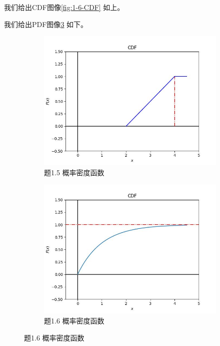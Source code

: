 \documentclass{article}
\begin{document}
	我们给出CDF图像\ref{fig:1-6-CDF} 如上。
	
	我们给出PDF图像\ref{fig:1-6-PDF} 如下。
	
		
	\begin{figure}[!ht]
		\centering
		\caption{概率密度函数}
		\label{fig:CDF function}
		\begin{subfigure}[b]{0.4\textwidth}
			\includegraphics[width=\textwidth]{figure/1-5-CDF}
			\caption{题1.5 概率密度函数}
			\label{fig:1-5-PDF}
		\end{subfigure}
		\begin{subfigure}[b]{0.4\textwidth}
			\includegraphics[width=\textwidth]{figure/1-6-CDF}
			\caption{题1.6 概率密度函数}
			\label{fig:1-6-PDF}
		\end{subfigure}
	\end{figure}
	
\end{document}
